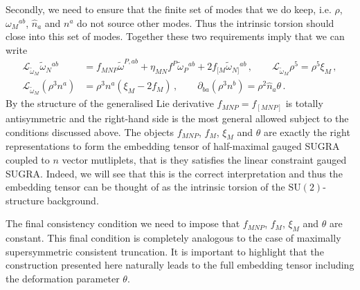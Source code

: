 \documentclass{PoS}
\newcommand{\SU}[1]{\mathrm{SU}( #1 )}
\newcommand{\tomega}{\tilde{\omega}}
\newcommand{\gL}{\mathcal{L}}
\begin{document}
Secondly, we need to ensure that the finite set of modes that we do keep, i.e. $\rho$, $\omega_M{}^{ab}$, $\hat{n}_a$ and $n^a$ do not source other modes. Thus the intrinsic torsion should close into this set of modes. Together these two requirements imply that we can write
\begin{equation}
 \begin{split}
  \gL_{\tomega_{M}} \tomega_{N}{}^{ab} &= f_{MNP} \tomega^{P,ab} +  \eta_{MN} f^P \tomega_P{}^{ab} + 2 f_{[M} \tomega_{N]}{}^{ab} \,, \qquad \gL_{\tomega_M} \rho^5 = \rho^5 \xi_M \,, \\
  \gL_{\tomega_M} \left(\rho^3 n^a \right) &= \rho^3 n^a \left(\xi_M - 2  f_M \right) \,, \qquad \partial_{ba} \left(\rho^3 n^b \right) = \rho^2 \hat{n}_a \theta \,. \label{eq:DiffConstraints}
 \end{split}
\end{equation}
By the structure of the generalised Lie derivative $f_{MNP} = f_{[MNP]}$ is totally antisymmetric and the right-hand side is the most general allowed subject to the conditions discussed above. The objects $f_{MNP}$, $f_M$, $\xi_M$ and $\theta$ are exactly the right representations to form the embedding tensor of half-maximal gauged SUGRA \cite{Dibitetto:2015bia,Bergshoeff:2007vb} coupled to $n$ vector mutliplets, that is they satisfies the linear constraint gauged SUGRA. Indeed, we will see that this is the correct interpretation and thus the embedding tensor can be thought of as the intrinsic torsion of the $\SU{2}$-structure background.

The final consistency condition we need to impose that $f_{MNP}$, $f_M$, $\xi_M$ and $\theta$ are constant. This final condition is completely analogous to the case of maximally supersymmetric consistent truncation. It is important to highlight that the construction presented here naturally leads to the full embedding tensor including the deformation parameter $\theta$.
\end{document}
